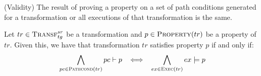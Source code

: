 \begin{proposition}{(Validity) The result of proving a property on a set of path conditions generated for a transformation or all executions of that transformation is the same.}
\label{prop:proof_validity}

Let $tr\in \textsc{Transf}^{sr}_{tg}$ be a transformation and $p \in \textsc{Property}(tr)$ be a
property of $tr$. Given this, we have that transformation $tr$ satisfies property $p$ if and only if:
\begin{equation}
\label{eq:prop_proof_transf}
\bigwedge_{pc\in \textsc{Pathcond}(tr)} pc\vdash p \hspace{.3cm} \Longleftrightarrow \hspace{.3cm} \bigwedge_{ex\in \textsc{Exec}(tr)}ex\models p
\end{equation}
\end{proposition}
